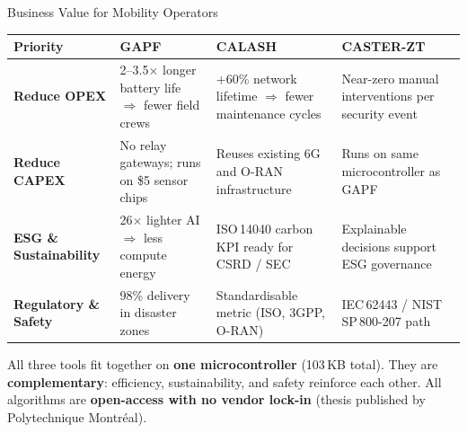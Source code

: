 \documentclass[aspectratio=169,t,10pt]{beamer}
\begin{document}
\begin{frame}[shrink=8]{Business Value for Mobility Operators}
\centering
\renewcommand{\arraystretch}{1.45}
\begin{tabular}{>{\bfseries\small}p{2.5cm}
                >{\small}p{3.05cm}
                >{\small}p{3.05cm}
                >{\small}p{3.05cm}}
  \toprule
  \textbf{Priority} & \textbf{GAPF} & \textbf{CALASH} & \textbf{CASTER-ZT} \\
  \midrule
  \rowcolor{blue!7}
  Reduce OPEX &
    2--3.5$\times$ longer battery life $\Rightarrow$ fewer field crews &
    +60\% network lifetime $\Rightarrow$ fewer maintenance cycles &
    Near-zero manual interventions per security event \\
  \rowcolor{green!7}
  Reduce CAPEX &
    No relay gateways; runs on \$5 sensor chips &
    Reuses existing 6G and O-RAN infrastructure &
    Runs on same microcontroller as GAPF \\
  \rowcolor{yellow!8}
  ESG \& Sustainability &
    26$\times$ lighter AI $\Rightarrow$ less compute energy &
    ISO\,14040 carbon KPI ready for CSRD / SEC &
    Explainable decisions support ESG governance \\
  \rowcolor{red!5}
  Regulatory \& Safety &
    98\% delivery in disaster zones &
    Standardisable metric (ISO, 3GPP, O-RAN) &
    IEC\,62443 / NIST\,SP\,800-207 path \\
  \bottomrule
\end{tabular}
\vspace{5pt}
\begin{exampleblock}{}
  \centering\small
  All three tools fit together on \textbf{one microcontroller} (103\,KB total).
  They are \textbf{complementary}: efficiency, sustainability, and safety reinforce each other.
  All algorithms are \textbf{open-access with no vendor lock-in}
  (thesis published by Polytechnique Montr\'eal).
\end{exampleblock}
\end{frame}
\end{document}

